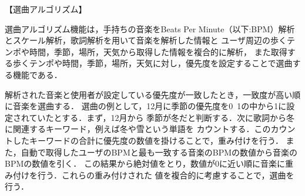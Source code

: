 【選曲アルゴリズム】
\par
選曲アルゴリズム機能は，手持ちの音楽をBeats Per Minute（以下:BPM）解析とスケール解析，歌詞解析を用いて音楽を解析した情報と
ユーザ周辺の歩くテンポや時間，季節，場所，天気から取得した情報を複合的に解析，
また取得する歩くテンポや時間，季節，場所，天気に対し，優先度を設定することで選曲する機能である．

\par
解析された音楽と使用者が設定している優先度が一致したとき，一致度が高い順に音楽を選曲する．
選曲の例として，12月に季節の優先度を0~1の中から1に設定されていたとする．まず，12月から
季節が冬だと判断する．次に歌詞から冬に関連するキーワード，例えば冬や雪という単語を
カウントする．このカウントしたキーワードの合計に優先度の数値を掛けることで，重み付けを行う．
また，自動で取得したユーザのBPMと最も一致する音楽のBPMの数値から音楽のBPMの数値を引く．
この結果から絶対値をとり，数値が0に近い順に音楽に重み付けを行う．これらの重み付けされた
値を複合的に考慮することで，選曲を行う．

